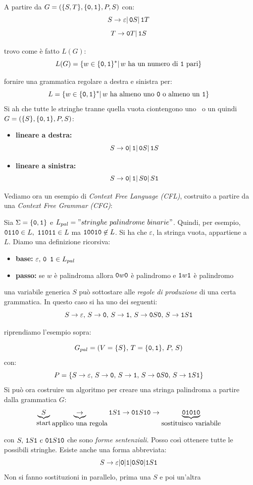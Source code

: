 \begin{example}
	A partire da $G=(\{S,T\},\{\mathtt{0},\mathtt{1}\},P,S)$ con:
	$$S\to\varepsilon|\,\mathtt{0} S|\,\mathtt{1} T$$
	$$T\to \mathtt{0} T|\,\mathtt{1} S$$

	trovo come è fatto $L(G)$:
	$$L(G)=\{w\in\{\zero,\uno\}^*|\, w \mbox{ ha un numero di \uno\ pari}\}$$
\end{example}
\begin{example}
	fornire una grammatica regolare a destra e sinistra per:
	$$L=\{w\in\{\zero,\uno\}^*|\, w \mbox{ ha almeno uno \zero\ o almeno un \uno}\}$$
	Si ah che tutte le stringhe tranne quella vuota ciontengono uno \zero\ o un \uno
	quindi  $G=(\{S\},\{\mathtt{0},\mathtt{1}\},P,S)$:
	\begin{itemize}
		\item \textbf{lineare a destra:}
		      $$S\to \mathtt{0}|\,\mathtt{1}|\,\mathtt{0} S|\,\mathtt{1} S$$
		\item \textbf{lineare a sinistra:}
		      $$S\to \mathtt{0}|\,\mathtt{1}|\,S\mathtt{0}|\,S\mathtt{1}$$
	\end{itemize}
\end{example}



Vediamo ora un esempio di \textit{Context Free Language (CFL)}, costruito a partire da una \textit{Context Free Grammar (CFG)}:
\begin{example}
	Sia $\Sigma=\{\mathtt{0}, \mathtt{1}\}$ e $L_{pal}="stringhe\,\, palindrome\,\, binarie"$.
	Quindi, per esempio, $\mathtt{0}\mathtt{1}\mathtt{1}\mathtt{0}\in L,\,\, \mathtt{1}\mathtt{1}\mathtt{0}\mathtt{1}\mathtt{1}\in L$ ma $\mathtt{1}\mathtt{0}\mathtt{0}\mathtt{1}\mathtt{0}\not\in L$. Si ha che $\varepsilon$, la stringa vuota, appartiene a $L$. Diamo una definizione ricorsiva:
	\begin{itemize}
		\item \textbf{base:} $\varepsilon,\, \mathtt{0}\,\ \mathtt{1}\in L_{pal}$
		\item \textbf{passo:} se $w$ è palindroma allora $\mathtt{0} w\mathtt{0}$ è palindromo e $\mathtt{1} w\mathtt{1}$ è palindromo
	\end{itemize}
	una variabile generica $S$ può sottostare alle \textit{regole di produzione} di una certa grammatica. In questo caso si ha uno dei seguenti:
	$$S\to\varepsilon,\, S\to \mathtt{0},\, S\to \mathtt{1},\, S\to \mathtt{0} S\mathtt{0},\, S\to \mathtt{1} S\mathtt{1}$$
\end{example}


riprendiamo l'esempio sopra:
\begin{example}
	$$G_{pal}=(V=\{S\},\, T=\{\mathtt{0}, \mathtt{1}\},\, P,\, S)$$
	con:
	$$P=\{S\to\varepsilon,\, S\to \mathtt{0},\, S\to \mathtt{1},\, S\to \mathtt{0} S\mathtt{0},\, S\to \mathtt{1} S\mathtt{1}\}$$
	Si può ora costruire un algoritmo per creare una stringa palindroma a partire dalla grammatica $G$:
	$$\underbrace{S}_{\mbox{start}}\underbrace{\to}_{\mbox{applico una regola}} \mathtt{1} S\mathtt{1} \to \mathtt{0}\mathtt{1} S\mathtt{1}\mathtt{0}\to \underbrace{\mathtt{0}\mathtt{1}\mathtt{0}\mathtt{1}\mathtt{0}}_{\mbox{sostituisco variabile}}$$

	con $S,\, \mathtt{1} S\mathtt{1}\,\, e\,\, \mathtt{0}\mathtt{1} S\mathtt{1}\mathtt{0}$ che sono \textit{forme sentenziali}. Posso così ottenere tutte le possibili stringhe. Esiste anche una forma abbreviata:
	$$S\to \varepsilon|\mathtt{0}|\mathtt{1}|\mathtt{0} S\mathtt{0}|\mathtt{1} S\mathtt{1}$$
	Non si fanno sostituzioni in parallelo, prima una $S$ e poi un'altra
\end{example}


